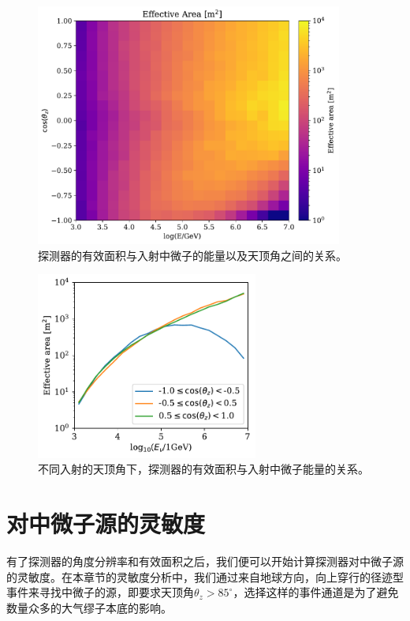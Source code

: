 \begin{figure}[!htb]%
    \centering
    \includegraphics[width=0.90\textwidth]{img/eff_area.pdf}
    \caption{探测器的有效面积与入射中微子的能量以及天顶角之间的关系。}
    \label{fig:eff_area}
\end{figure}

\begin{figure}[!htb]%
    \centering
    \includegraphics[width=0.65\textwidth]{img/eff_area_band.pdf}
    \caption{不同入射的天顶角下，探测器的有效面积与入射中微子能量的关系。}
    \label{fig:eff_area_band}
\end{figure}

\section{对中微子源的灵敏度}

有了探测器的角度分辨率和有效面积之后，我们便可以开始计算探测器对中微子源的灵敏度。在本章节的灵敏度分析中，我们通过来自地球方向，向上穿行的径迹型事件来寻找中微子的源，即要求天顶角$\theta_z > 85^\circ$，选择这样的事件通道是为了避免数量众多的大气缪子本底的影响。

